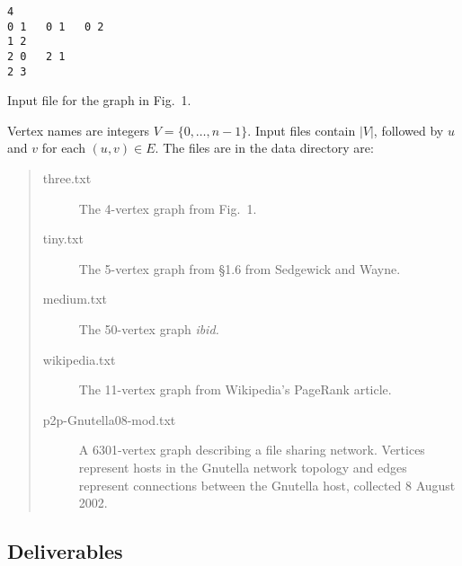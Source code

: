 \documentclass{tufte-handout}
\begin{document}
\begin{marginfigure}
\begin{verbatim}
4
0 1   0 1   0 2
1 2   
2 0   2 1
2 3
\end{verbatim}
\caption{Input file for the graph in Fig.~1.}
\end{marginfigure}

Vertex names are integers $V= \{0,\ldots, n-1\}$.
Input files contain $|V|$, followed by $u$ and $v$ for each $(u,v)\in
E$.
The files are in the data directory are:
\begin{quotation}
\begin{description}
\item[three.txt] The 4-vertex graph from Fig.~1.
\item[tiny.txt] The 5-vertex graph from \S{}1.6 from Sedgewick and
  Wayne.
\item[medium.txt] The 50-vertex graph \emph{ibid.}
\item[wikipedia.txt] The 11-vertex graph from Wikipedia's PageRank article.
\item[p2p-Gnutella08-mod.txt] A 6301-vertex graph describing a file
  sharing network. 
Vertices represent hosts in the Gnutella network topology and edges
represent connections between the Gnutella host, collected 8 August
2002.
\end{description}
\end{quotation}

\subsection{Deliverables}
\end{document}
